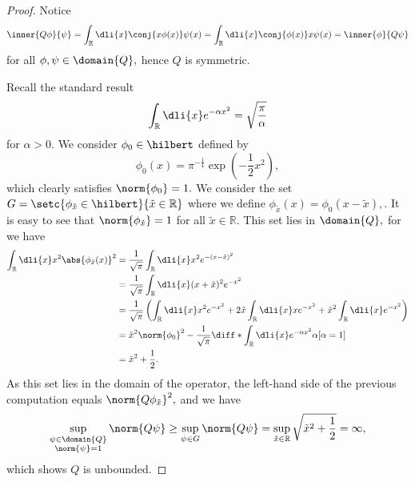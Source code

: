 \begin{proof}
    Notice
    \begin{equation*}
        \inner{Q\phi}{\psi} = \int_{\mathbb{R}} \dli{x} \conj{x \phi(x)} \psi(x)\\
                            = \int_{\mathbb{R}} \dli{x} \conj{\phi(x)} x\psi(x)\\
                            = \inner{\phi}{Q\psi}
    \end{equation*}
    for all \(\phi, \psi \in \domain{Q},\) hence \(Q\) is symmetric.

    Recall the standard result
    \begin{equation*}
        \int_{\mathbb{R}} \dli{x} e^{-\alpha x^2} = \sqrt{\frac{\pi}{\alpha}}
    \end{equation*}
    for \(\alpha > 0.\)
    We consider \(\phi_0 \in \hilbert\) defined by
    \begin{equation*}
        \phi_0(x) = \pi^{-\frac14}\exp\left(-\frac12 x^2\right),
    \end{equation*}
    which clearly satisfies \(\norm{\phi_0} = 1.\) We consider the set \(G = \setc{\phi_{\tilde{x}} \in \hilbert}{\tilde{x} \in \mathbb{R}}\) where we define \(\phi_{\tilde{x}}(x) = \phi_0(x - \tilde{x}),\). It is easy to see that \(\norm{\phi_{\tilde{x}}} = 1\) for all \(\tilde{x} \in \mathbb{R}.\) This set lies in \(\domain{Q},\) for we have
    \begin{align*}
        \int_{\mathbb{R}} \dli{x} x^2 \abs{\phi_{\tilde{x}}(x)}^2 &= \frac{1}{\sqrt{\pi}}\int_{\mathbb{R}} \dli{x} x^2 e^{-(x-\tilde{x})^2}\\
                                                        &= \frac{1}{\sqrt{\pi}}\int_{\mathbb{R}} \dli{x} (x + \tilde{x})^2 e^{-x^2}\\
                                                        & = \frac{1}{\sqrt{\pi}} \left(\int_{\mathbb{R}} \dli{x} x^2 e^{-x^2} + 2\tilde{x} \int_{\mathbb{R}} \dli{x} x e^{-x^2} + \tilde{x}^2 \int_{\mathbb{R}} \dli{x} e^{-x^2}\right)\\
                                                        &= \tilde{x}^2 \norm{\phi_0}^2 - \frac{1}{\sqrt{\pi}} \diff*{\int_{\mathbb{R}} \dli{x} e^{-\alpha x^2}}{\alpha}[\alpha = 1]\\
                                                        &= \tilde{x}^2 + \frac12.
    \end{align*}
    As this set lies in the domain of the operator, the left-hand side of the previous computation equals \(\norm{Q \phi_{\tilde{x}}}^2,\) and we have
    \begin{equation*}
        \sup_{\substack{\psi \in \domain{Q}\\\norm{\psi} = 1}}{\norm{Q \psi}} \geq \sup_{\psi \in G}{\norm{Q \psi}} = \sup_{\tilde{x} \in \mathbb{R}}{\sqrt{\tilde{x}^2 + \frac12}} = \infty,
    \end{equation*}
    which shows \(Q\) is unbounded.
\end{proof}


